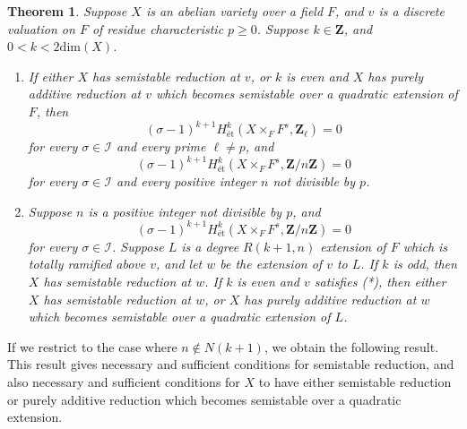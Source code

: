 \documentclass{amsart}
\def\Z{{\mathbf Z}}
\def\I{{\mathcal I}}
\def\dim{\mathrm{dim}}
\newtheorem{thm}{Theorem}[section]
\theoremstyle{definition}
\begin{document}
\begin{thm}
\label{highercoh}
Suppose $X$ is an abelian variety over a field $F$, and $v$ is a discrete 
valuation on $F$ of residue characteristic $p \ge 0$.
Suppose $k \in \Z$, and
$0 < k < 2\dim(X)$.
\begin{enumerate}
\item[{(i)}] If either $X$ has semistable reduction at $v$, 
or $k$ is even and 
$X$ has purely additive reduction at $v$ which becomes
semistable over a quadratic extension of $F$,
then 
$$(\sigma - 1)^{k+1}H^k_{\text{\'et}}(X \times_F F^s, \Z_{\ell}) = 0$$ 
for every $\sigma \in \I$ and every prime $\ell \ne p$,
and
$$(\sigma - 1)^{k+1}H^k_{\text{\'et}}(X \times_F F^s, \Z/n\Z) = 0$$ 
for every $\sigma \in \I$ and every positive integer $n$ not
divisible by $p$.
\item[{(ii)}] Suppose $n$ is a positive integer not divisible by
$p$, and 
$$(\sigma - 1)^{k+1}H^k_{\text{\'et}}(X \times_F F^s, \Z/n\Z) = 0$$ 
for every $\sigma \in \I$. 
Suppose $L$ is a degree $R(k+1,n)$ extension of $F$ which is
totally ramified above $v$, and let $w$ be the extension of
$v$ to $L$.
If $k$ is odd, then $X$ has semistable reduction at $w$.
If $k$ is even and $v$ satisfies (*), 
then either $X$ has semistable reduction at $w$, or
$X$ has purely additive reduction at $w$ which becomes
semistable over a quadratic extension of $L$.
\end{enumerate}
\end{thm}

If we restrict to the case where $n \notin N(k+1)$, we obtain
the following result. This result gives necessary and sufficient
conditions for semistable reduction, and also necessary and
sufficient conditions for $X$ to have either semistable reduction
or purely additive reduction which becomes semistable over a
quadratic extension.
\end{document}
